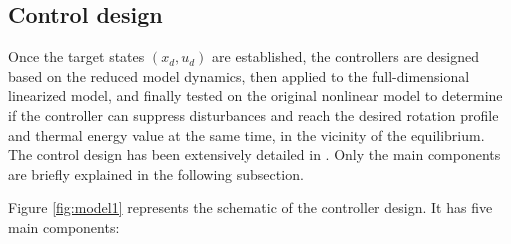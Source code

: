 \documentclass[12pt,lot, lof]{puthesis}
\begin{document}
\subsection{Control design} \label{sec:control_design}

Once the target states $\left( x_{d} , u_{d} \right)$ are established, the controllers are designed based on the reduced model dynamics, then applied to the full-dimensional linearized model, and finally tested on the original nonlinear model to determine if the controller can suppress disturbances and reach the desired rotation profile and thermal energy value at the same time, in the vicinity of the equilibrium.
The control design has been extensively detailed in \cite{Goumiri15}. Only the main components are briefly explained in the following subsection. 

Figure \ref{fig:model1} represents the schematic of the controller design. It has five main components:
\end{document}

